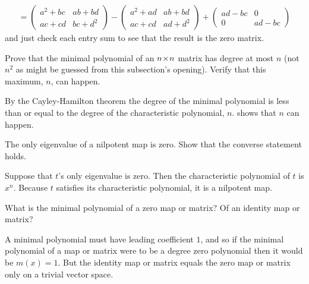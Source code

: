 \begin{exercises}
\begin{answer}
\begin{multline*}
         =                     
         \begin{pmatrix}
            a^2+bc  &ab+bd  \\
            ac+cd   &bc+d^2
         \end{pmatrix}
         -
         \begin{pmatrix}
            a^2+ad  &ab+bd   \\
            ac+cd   &ad+d^2
         \end{pmatrix}
         +
         \begin{pmatrix}
            ad-bc  &0      \\
            0      &ad-bc
         \end{pmatrix}
      \end{multline*}
      and just check each entry sum to see that the result is the zero matrix.
    \end{answer}
  \recommended \item
    Prove that the minimal polynomial of an \( n \! \times \! n \) matrix has
    degree at most \( n \) (not \( n^2 \) as might be guessed from this
    subsection's opening).
    Verify that this maximum, \( n \), can happen.
    \begin{answer}
      By the Cayley-Hamilton theorem the degree of the minimal polynomial is
      less than or equal to the degree of the characteristic polynomial,
      \( n \).
       shows that \( n \) can happen.
    \end{answer}
   \recommended \item 
     The only eigenvalue of a nilpotent map is zero.
     Show that the converse statement holds.
     \begin{answer}
       Suppose that \( t \)'s only eigenvalue is zero.
       Then the characteristic polynomial of \( t \) is \( x^n \).
       Because \( t \) satisfies its characteristic polynomial, it is
       a nilpotent map. 
     \end{answer}
   \item 
       What is the minimal polynomial of a zero map or matrix?
       Of an identity map or matrix?
       \begin{answer}
         A minimal polynomial must have leading coefficient $1$, 
         and so if the minimal polynomial of a map or matrix were to 
         be a degree zero polynomial then it would be $m(x)=1$.
         But the identity map or matrix equals the zero map or matrix
         only on a trivial vector space.


\end{answer}
\end{exercises}

